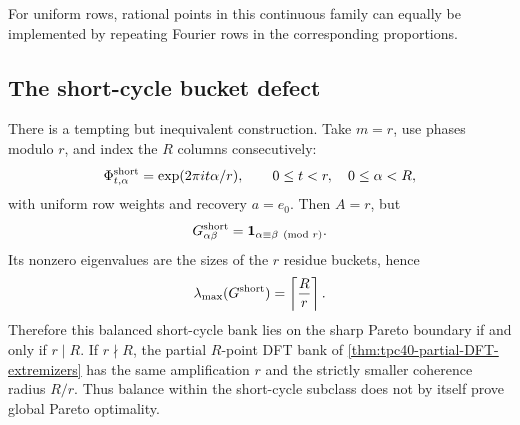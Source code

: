 For uniform rows, rational points in this continuous family can equally be
implemented by repeating Fourier rows in the corresponding proportions.

\subsection{The short-cycle bucket defect}

There is a tempting but inequivalent construction.  Take \(m=r\), use
phases modulo \(r\), and index the \(R\) columns consecutively:
\begin{equation}
 \Phi^{\rm short}_{t,\alpha}
 =\exp(2\pi i t\alpha/r),
 \qquad0\le t<r,\quad0\le\alpha<R,
 \label{eq:tpc40-short-cycle-bank}
\end{equation}
with uniform row weights and recovery \(a=e_0\).  Then \(A=r\), but
\begin{equation}
 G^{\rm short}_{\alpha\beta}
 =\mathbf 1_{\alpha\equiv\beta\pmod r}.
 \label{eq:tpc40-short-cycle-Gram}
\end{equation}
Its nonzero eigenvalues are the sizes of the \(r\) residue buckets, hence
\begin{equation}
 \lambda_{\max}(G^{\rm short})
 =\left\lceil\frac Rr\right\rceil.
 \label{eq:tpc40-short-cycle-lambda}
\end{equation}
Therefore this balanced short-cycle bank lies on the sharp Pareto boundary
if and only if \(r\mid R\).  If \(r\nmid R\), the partial \(R\)-point DFT
bank of \cref{thm:tpc40-partial-DFT-extremizers} has the same amplification
\(r\) and the strictly smaller coherence radius \(R/r\).  Thus balance
within the short-cycle subclass does not by itself prove global Pareto
optimality.
